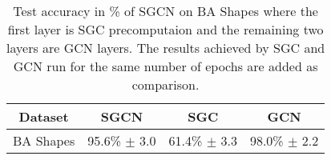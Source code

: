 \begin{table}
    \centering
    \begin{tabular}{c|c|cc}
        \textbf{Dataset} & \textbf{SGCN} & \textbf{SGC} & \textbf{GCN} \\
        \midrule
        BA Shapes       & 95.6\% $\pm$ 3.0 & 61.4\% $\pm$ 3.3 & 98.0\% $\pm$ 2.2 \\
    \end{tabular}
    \caption{Test accuracy in \% of SGCN on BA Shapes where the first layer is SGC precomputaion and the remaining two layers are GCN layers. The results achieved by SGC and GCN run for the same number of epochs are added as comparison.}
    \label{tab:SGCN-acc}
\end{table}

